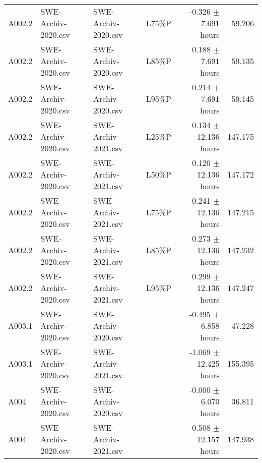 \begin{longtable}{lllrrr}
 A002.2      & SWE-Archiv-2020.csv & SWE-Archiv-2020.csv &        L75\%P &  -0.326 $\pm$ 7.691 hours &  59.206 \\
 A002.2      & SWE-Archiv-2020.csv & SWE-Archiv-2020.csv &        L85\%P &   0.188 $\pm$ 7.691 hours &  59.135 \\
 A002.2      & SWE-Archiv-2020.csv & SWE-Archiv-2020.csv &        L95\%P &   0.214 $\pm$ 7.691 hours &  59.145 \\
 A002.2      & SWE-Archiv-2020.csv & SWE-Archiv-2021.csv &        L25\%P &  0.134 $\pm$ 12.136 hours & 147.175 \\
 A002.2      & SWE-Archiv-2020.csv & SWE-Archiv-2021.csv &        L50\%P &  0.120 $\pm$ 12.136 hours & 147.172 \\
 A002.2      & SWE-Archiv-2020.csv & SWE-Archiv-2021.csv &        L75\%P & -0.241 $\pm$ 12.136 hours & 147.215 \\
 A002.2      & SWE-Archiv-2020.csv & SWE-Archiv-2021.csv &        L85\%P &  0.273 $\pm$ 12.136 hours & 147.232 \\
 A002.2      & SWE-Archiv-2020.csv & SWE-Archiv-2021.csv &        L95\%P &  0.299 $\pm$ 12.136 hours & 147.247 \\
 A003.1      & SWE-Archiv-2020.csv & SWE-Archiv-2020.csv &               &  -0.495 $\pm$ 6.858 hours &  47.228 \\
 A003.1      & SWE-Archiv-2020.csv & SWE-Archiv-2021.csv &               & -1.069 $\pm$ 12.425 hours & 155.395 \\
 A004        & SWE-Archiv-2020.csv & SWE-Archiv-2020.csv &               &  -0.000 $\pm$ 6.070 hours &  36.811 \\
 A004        & SWE-Archiv-2020.csv & SWE-Archiv-2021.csv &               & -0.508 $\pm$ 12.157 hours & 147.938 \\
\hline
\end{longtable}